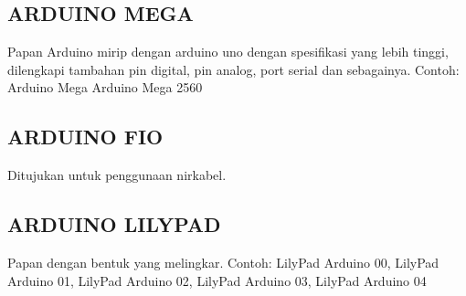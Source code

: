 \subsection {ARDUINO MEGA}
Papan Arduino mirip dengan arduino uno dengan spesifikasi yang lebih tinggi, dilengkapi tambahan pin digital, pin analog, port serial dan sebagainya.  Contoh: 
Arduino Mega  
Arduino Mega 2560  

\subsection {ARDUINO FIO}
Ditujukan untuk penggunaan nirkabel. 

\subsection {ARDUINO LILYPAD}
Papan dengan bentuk yang melingkar. Contoh: 
LilyPad Arduino 00, LilyPad Arduino 01, 
LilyPad Arduino 02, LilyPad Arduino 03,
LilyPad Arduino 04
